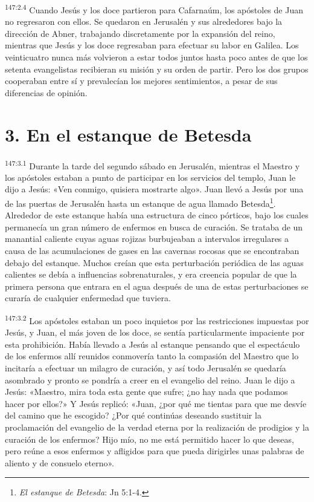 \par 
\textsuperscript{147:2.4} Cuando Jesús y los doce partieron para Cafarnaúm, los apóstoles de Juan no regresaron con ellos. Se quedaron en Jerusalén y sus alrededores bajo la dirección de Abner, trabajando discretamente por la expansión del reino, mientras que Jesús y los doce regresaban para efectuar su labor en Galilea. Los veinticuatro nunca más volvieron a estar todos juntos hasta poco antes de que los setenta evangelistas recibieran su misión y su orden de partir. Pero los dos grupos cooperaban entre sí y prevalecían los mejores sentimientos, a pesar de sus diferencias de opinión.

\section*{3. En el estanque de Betesda}
\par 
\textsuperscript{147:3.1} Durante la tarde del segundo sábado en Jerusalén, mientras el Maestro y los apóstoles estaban a punto de participar en los servicios del templo, Juan le dijo a Jesús: «Ven conmigo, quisiera mostrarte algo». Juan llevó a Jesús por una de las puertas de Jerusalén hasta un estanque de agua llamado Betesda\footnote{\textit{El estanque de Betesda}: Jn 5:1-4.}. Alrededor de este estanque había una estructura de cinco pórticos, bajo los cuales permanecía un gran número de enfermos en busca de curación. Se trataba de un manantial caliente cuyas aguas rojizas burbujeaban a intervalos irregulares a causa de las acumulaciones de gases en las cavernas rocosas que se encontraban debajo del estanque. Muchos creían que esta perturbación periódica de las aguas calientes se debía a influencias sobrenaturales, y era creencia popular de que la primera persona que entrara en el agua después de una de estas perturbaciones se curaría de cualquier enfermedad que tuviera.

\par 
\textsuperscript{147:3.2} Los apóstoles estaban un poco inquietos por las restricciones impuestas por Jesús, y Juan, el más joven de los doce, se sentía particularmente impaciente por esta prohibición. Había llevado a Jesús al estanque pensando que el espectáculo de los enfermos allí reunidos conmovería tanto la compasión del Maestro que lo incitaría a efectuar un milagro de curación, y así todo Jerusalén se quedaría asombrado y pronto se pondría a creer en el evangelio del reino. Juan le dijo a Jesús: «Maestro, mira toda esta gente que sufre; ¿no hay nada que podamos hacer por ellos?» Y Jesús replicó: «Juan, ¿por qué me tientas para que me desvíe del camino que he escogido? ¿Por qué continúas deseando sustituir la proclamación del evangelio de la verdad eterna por la realización de prodigios y la curación de los enfermos? Hijo mío, no me está permitido hacer lo que deseas, pero reúne a esos enfermos y afligidos para que pueda dirigirles unas palabras de aliento y de consuelo eterno».

